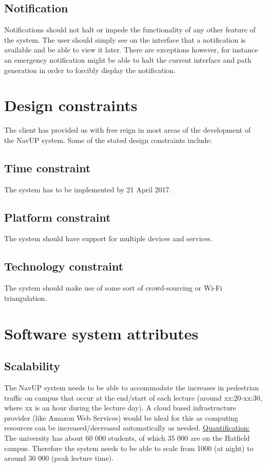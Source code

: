 \documentclass[english]{article}
\begin{document}
	\subsection{Notification}
Notifications should not halt or impede the functionality of any other feature of the system. The user should simply see on the interface that a notification is available and be able to view it later. There are exceptions however, for instance an emergency notification might be able to halt the current interface and path generation in order to forcibly display the notification. 
	\section{Design constraints}
	The client has provided us with free reign in most areas of the development of the NavUP system. Some of the stated design constraints include:
			\subsection{Time constraint}	The system has to be implemented by 21 April 2017.	
			\subsection{Platform constraint}	The system should have support for multiple devices and services.
			\subsection{Technology constraint}	The system should make use of some sort of crowd-sourcing or Wi-Fi triangulation.	

	\section{Software system attributes}
	\subsection{Scalability}
	The NavUP system needs to be able to accommodate the increases in pedestrian traffic on campus that occur at the end/start of each lecture (around xx:20-xx:30, where xx is an hour during the lecture day). A cloud based infrastructure provider (like Amazon Web Services) would be ideal for this as computing resources can be increased/decreased automatically as needed.
	\newline
	\newline
	\underline{Quantification:} The university has about 60 000 students, of which 35 000 are on the Hatfield campus. Therefore the system needs to be able to scale from 1000 (at night) to around 30 000 (peak lecture time).
\end{document}
